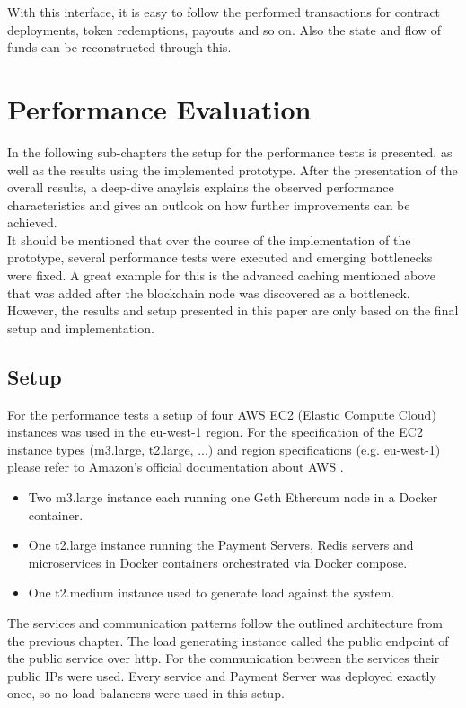 \documentclass[a4paper,12pt]{scrartcl}
\begin{document}
With this interface, it is easy to follow the performed transactions for contract deployments, token redemptions, payouts and so on. Also the state and flow of funds can be reconstructed through this.


\newpage
\section{Performance Evaluation}

In the following sub-chapters the setup for the performance tests is presented, as well as the results using the implemented prototype. After the presentation of the overall results, a deep-dive anaylsis explains the observed performance characteristics and gives an outlook on how further improvements can be achieved.\\

It should be mentioned that over the course of the implementation of the prototype, several performance tests were executed and emerging bottlenecks were fixed. A great example for this is the advanced caching mentioned above that was added after the blockchain node was discovered as a bottleneck.\\
However, the results and setup presented in this paper are only based on the final setup and implementation.\\

\subsection{Setup}

For the performance tests a setup of four AWS EC2 (Elastic Compute Cloud) \cite{awsec2} instances was used in the eu-west-1 region. For the specification of the EC2 instance types (m3.large, t2.large, ...) and region specifications (e.g. eu-west-1) please refer to Amazon's official documentation about AWS \cite{web38}.
\begin{itemize}
\item Two m3.large instance each running one Geth Ethereum node in a Docker container.
\item One t2.large instance running the Payment Servers, Redis servers and microservices in Docker containers orchestrated via Docker compose.
\item One t2.medium instance used to generate load against the system.
\end{itemize}

The services and communication patterns follow the outlined architecture from the previous chapter. The load generating instance called the public endpoint of the public service over http. For the communication between the services their public IPs were used. Every service and Payment Server was deployed exactly once, so no load balancers were used in this setup.\\
\end{document}
